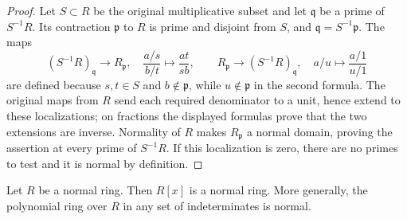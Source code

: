\begin{proof}
Let $S\subset R$ be the original multiplicative subset and
let $\mathfrak q$ be a prime of $S^{-1}R$. Its contraction
$\mathfrak p$ to $R$ is prime and disjoint from $S$, and
$\mathfrak q=S^{-1}\mathfrak p$. The maps
$$
(S^{-1}R)_{\mathfrak q}\longrightarrow R_{\mathfrak p},
\quad\frac{a/s}{b/t}\longmapsto\frac{at}{sb},
\qquad
R_{\mathfrak p}\longrightarrow(S^{-1}R)_{\mathfrak q},
\quad a/u\longmapsto\frac{a/1}{u/1}
$$
are defined because $s,t\in S$ and $b\notin\mathfrak p$,
while $u\notin\mathfrak p$ in the second formula. The original
maps from $R$ send each required denominator to a unit, hence
extend to these localizations; on fractions the displayed formulas
prove that the two extensions are inverse. Normality of $R$
makes $R_{\mathfrak p}$ a normal domain, proving the assertion
at every prime of $S^{-1}R$. If this localization is zero,
there are no primes to test and it is normal by definition.
\end{proof}

\begin{lemma}
\label{editorial-source-lemma-polynomial-ring-normal}
Let $R$ be a normal ring. Then $R[x]$ is a normal ring.
More generally, the polynomial ring over $R$ in any set of
indeterminates is normal.
\end{lemma}

